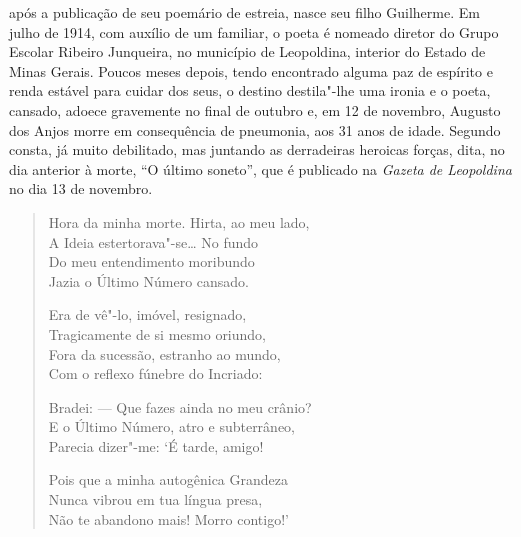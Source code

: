 após a publicação de seu poemário de estreia, nasce seu filho
Guilherme. Em julho de 1914, com auxílio de um familiar, o poeta é
nomeado diretor do Grupo Escolar Ribeiro Junqueira, no município de
Leopoldina, interior do Estado de Minas Gerais. Poucos meses depois,
tendo encontrado alguma paz de espírito e renda estável para cuidar dos
seus, o destino destila"-lhe uma ironia e o poeta, cansado, adoece
gravemente no final de outubro e, em 12 de novembro, Augusto dos Anjos
morre em consequência de pneumonia, aos 31 anos de idade. Segundo
consta, já muito debilitado, mas juntando as derradeiras heroicas
forças, dita, no dia anterior à morte, “O último soneto”, que é
publicado na \textit{Gazeta de Leopoldina} no dia 13 de novembro. 

\begin{verse}
Hora da minha morte. Hirta, ao meu lado,\\
A Ideia estertorava"-se\ldots{} No fundo\\
Do meu entendimento moribundo\\
Jazia o Último Número cansado.

Era de vê"-lo, imóvel, resignado,\\
Tragicamente de si mesmo oriundo,\\
Fora da sucessão, estranho ao mundo,\\
Com o reflexo fúnebre do Incriado:

Bradei: --- Que fazes ainda no meu crânio?\\
E o Último Número, atro e subterrâneo,\\
Parecia dizer"-me: `É tarde, amigo!

Pois que a minha autogênica Grandeza\\
Nunca vibrou em tua língua presa,\\
Não te abandono mais! Morro contigo!'
\end{verse}

